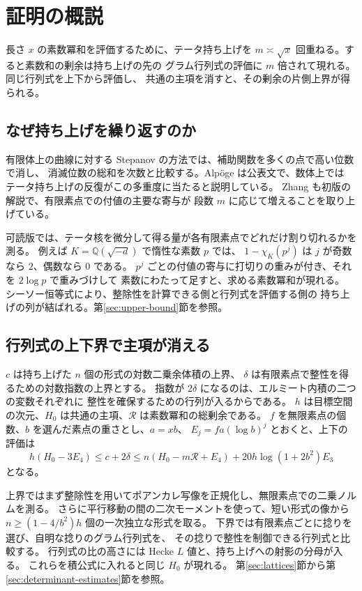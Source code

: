 \section*{証明の概説}
\label{sec:overview}

長さ \(x\) の素数冪和を評価するために、テータ持ち上げを
\(m\asymp\sqrt{x}\) 回重ねる。すると素数和の剰余は持ち上げの先の
グラム行列式の評価に \(m\) 倍されて現れる。同じ行列式を上下から評価し、
共通の主項を消すと、その剰余の片側上界が得られる。

\subsection*{なぜ持ち上げを繰り返すのか}

有限体上の曲線に対する Stepanov の方法では、補助関数を多くの点で高い位数で消し、
消滅位数の総和を次数と比較する。Alpöge は公表文で、数体上では
テータ持ち上げの反復がこの多重度に当たると説明している。
Zhang も初版の解説で、有限素点での付値の主要な寄与が
段数 \(m\) に応じて増えることを取り上げている。 \cite[第1・4頁]{alpoege} \cite[第4節]{zhang}

可読版では、テータ核を微分して得る量が各有限素点でどれだけ割り切れるかを測る。
例えば \(K=\mathbb Q(\sqrt{-d})\) で惰性な素数 \(p\) では、
\(1-\chi_K(p^j)\) は \(j\) が奇数なら \(2\)、偶数なら \(0\) である。
\(p^j\) ごとの付値の寄与に打切りの重みが付き、それを \(2\log p\) で重みづけして
素数にわたって足すと、求める素数冪和が現れる。
シーソー恒等式により、整除性を計算できる側と行列式を評価する側の
持ち上げの列が結ばれる。第\ref{sec:upper-bound}節を参照。

\subsection*{行列式の上下界で主項が消える}

\(c\) は持ち上げた \(n\) 個の形式の対数二乗余体積の上界、
\(\delta\) は有限素点で整性を得るための対数指数の上界とする。
指数が \(2\delta\) になるのは、エルミート内積の二つの変数それぞれに
整性を確保するための行列が入るからである。
\(h\) は目標空間の次元、\(H_0\) は共通の主項、\(\mathcal R\) は素数冪和の総剰余である。
\(f\) を無限素点の個数、\(b\) を選んだ素点の重さとし、\(a=xb\)、
\(E_j=fa(\log b)^j\) とおくと、上下の評価は
\[
 h(H_0-3E_4)
 \le c+2\delta
 \le n(H_0-m\mathcal R+E_4)
     +20h\log(1+2b^2)E_3
\]
となる。

上界ではまず整除性を用いてポアンカレ写像を正規化し、無限素点での二乗ノルムを測る。
さらに平行移動の間の二次モーメントを使って、短い形式の像から
\(n\ge(1-4/b^2)h\) 個の一次独立な形式を取る。
下界では有限素点ごとに捻りを選び、自明な捻りのグラム行列式を、
その捻りで整性を制御できる行列式と比較する。
行列式の比の高さには Hecke \(L\) 値と、持ち上げへの射影の分母が入る。
これらを積公式に入れると同じ \(H_0\) が現れる。
第\ref{sec:lattices}節から第\ref{sec:determinant-estimates}節を参照。

